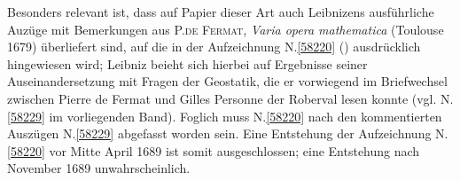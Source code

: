 Besonders relevant ist, dass auf Papier dieser Art auch Leibnizens ausführliche Auzüge mit Bemerkungen aus \textsc{P.\;de Fermat}, \textit{Varia opera mathematica} %
(Toulouse 1679)\cite{00533} überliefert sind, auf die in der Aufzeichnung N.\;\ref{58220} () ausdrücklich hingewiesen wird;
Leibniz beieht sich hierbei auf Ergebnisse seiner Auseinandersetzung mit Fragen der Geostatik, die er vorwiegend im Briefwechsel zwischen Pierre de Fermat und Gilles Personne der Roberval lesen konnte (vgl. N.\;\ref{58229} im vorliegenden Band).
Foglich muss N.\;\ref{58220} nach den kommentierten Auszügen N.\;\ref{58229} abgefasst worden sein.
Eine Entstehung der Aufzeichnung N.\;\ref{58220} vor Mitte April 1689 ist somit ausgeschlossen;
eine Entstehung nach November 1689 unwahrscheinlich.
\pend%
%
\frenchspacing%
\normalsize%
